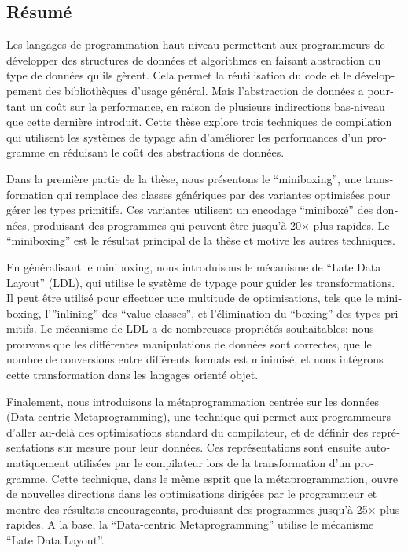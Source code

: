 \begin{otherlanguage}{french}
\cleardoublepage
\chapter*{Résumé}

\vspace{0.5em}

Les langages de programmation haut niveau permettent aux programmeurs de développer des structures de données et algorithmes en faisant abstraction du type de données qu'ils gèrent. Cela permet la réutilisation du code et le développement des bibliothèques d'usage général. Mais l'abstraction de données a pourtant un coût sur la performance, en raison de plusieurs indirections bas-niveau que cette dernière introduit. Cette thèse explore trois techniques de compilation qui utilisent les systèmes de typage afin d'améliorer les performances d’un programme en réduisant le coût des abstractions de données.

\vspace{0.3em}

Dans la première partie de la thèse, nous présentons le “miniboxing”, une transformation qui remplace des classes génériques par des variantes optimisées pour gérer les types primitifs. Ces variantes utilisent un encodage “miniboxé” des données, produisant des programmes qui peuvent être jusqu'à 20$\times$ plus rapides. Le “miniboxing” est le résultat principal de la thèse et motive les autres techniques.

\vspace{0.3em}

En généralisant le miniboxing, nous introduisons le mécanisme de “Late Data Layout” (LDL), qui utilise le système de typage pour guider les transformations. Il peut être utilisé pour effectuer une multitude de optimisations, tels que le miniboxing, l’”inlining” des “value classes”, et l’élimination du “boxing” des types primitifs. Le mécanisme de LDL a de nombreuses propriétés souhaitables: nous prouvons que les différentes manipulations de données sont correctes, que le nombre de conversions entre différents formats est minimisé, et nous intégrons cette transformation dans les langages orienté objet.

\vspace{0.3em}

Finalement, nous introduisons la métaprogrammation centrée sur les données (Data-centric Metaprogramming), une technique qui permet aux programmeurs d'aller au-delà des optimisations standard du compilateur, et de définir des représentations sur mesure pour leur données. Ces représentations sont ensuite automatiquement utilisées par le compilateur lors de la transformation d'un programme. Cette technique, dans le même esprit que la métaprogrammation, ouvre de nouvelles directions dans les optimisations dirigées par le programmeur et montre des résultats encourageants, produisant des programmes jusqu'à 25$\times$ plus rapides. A la base, la “Data-centric Metaprogramming” utilise le mécanisme “Late Data Layout”.


\end{otherlanguage}

